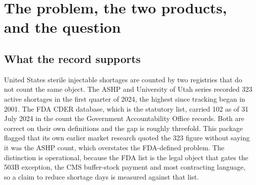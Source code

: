 
\begin{abstract}
\noindent
This memo asks under what product, demand, regulatory and operating conditions regional
manufacturing of sterile injectables could reduce shortages more effectively than safety
stock, dual sourcing, or additional centralized capacity. It compares those options on two
non-controlled small-molecule presentations: sodium bicarbonate 8.4 percent in a 50 mL vial,
in prolonged shortage, and norepinephrine bitartrate 1 mg/mL in a 4 mL vial, resolved. The
method is a protocol frozen before any result, a deterministic screen reconciled cell for
cell against the source spreadsheet, a daily discrete-event simulation in which every
strategy faces the same simulated world, optimization of each strategy to one pre-specified
service target, and an ablation harness over named failure mechanisms. The answer is
conditional and largely negative: what decides the outcome is capacity relative to demand and
correlated failure across nominally separate sites, and neither is improved by distributing
manufacture as such. The study retracted three of its own headline conclusions after
correcting defects in its own model, and that history is reported here rather than removed.
\end{abstract}

\section{The problem, the two products, and the question}
\label{sec:question}

\subsection{What the record supports}
\label{sec:record}

United States sterile injectable shortages are counted by two registries that do not count the
same object. The ASHP and University of Utah series recorded 323 active shortages in the first
quarter of 2024, the highest since tracking began in 2001. The FDA CDER database, which is the
statutory list, carried 102 as of 31 July 2024 in the count the Government Accountability
Office records. Both are correct on their own definitions and the gap is roughly threefold.
This package flagged that its own earlier market research quoted the 323 figure without saying
it was the ASHP count, which overstates the FDA-defined problem. The distinction is
operational, because the FDA list is the legal object that gates the 503B exception, the CMS
buffer-stock payment and most contracting language, so a claim to reduce shortage days is
measured against that list.


